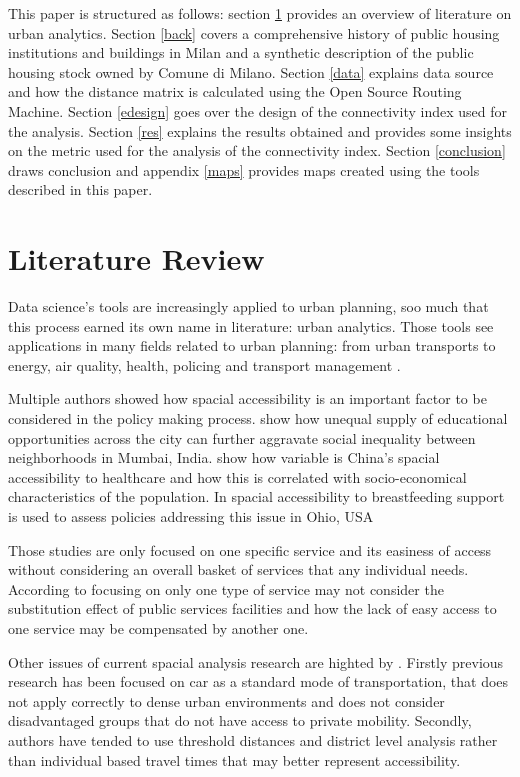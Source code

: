 \documentclass[11pt, titlepage]{article}
\begin{document}
This paper is structured as follows: section \ref{lirev} provides an overview of literature on urban analytics. Section \ref{back} covers a comprehensive history of public housing institutions and buildings in Milan and a synthetic description of the public housing stock owned by Comune di Milano. Section \ref{data} explains data source and how the distance matrix is calculated using the Open Source Routing Machine. Section \ref{edesign} goes over the design of the connectivity index used for the analysis. Section \ref{res} explains the results obtained and provides some insights on the metric used for the analysis of the connectivity index. Section \ref{conclusion} draws conclusion and appendix \ref{maps} provides maps created using the tools described in this paper.

\section{Literature Review}
\label{lirev}

Data science's tools are increasingly applied to urban planning, soo much that this process earned its own name in literature: urban analytics. Those tools see applications in many fields related to urban planning: from urban transports to energy, air quality, health, policing and transport management \parencite{Kandt2021}. 

Multiple authors showed how spacial accessibility is an important factor to be considered in the policy making process. \cite{Sharma2022} show how unequal supply of educational opportunities across the city can further aggravate social inequality between neighborhoods in Mumbai, India. \cite{Yin2018} show how variable is China's spacial accessibility to healthcare and how this is correlated with socio-economical characteristics of the population. In \cite{Grubesic2017} spacial accessibility to breastfeeding support is used to assess policies addressing this issue in Ohio, USA

Those studies are only focused on one specific service and its easiness of access without considering an overall basket of services that any individual needs. According to \cite{wang2005assessing}
focusing on only one type of service may not consider the substitution effect of public services facilities and how the lack of easy access to one service may be compensated by another one.

Other issues of current spacial analysis research are highted by \cite{Li2021}. Firstly previous research has been focused on car as a standard mode of transportation, that does not apply correctly to dense urban environments and does not consider disadvantaged groups that do not have access to private mobility. Secondly, authors have tended to use threshold distances and district level analysis rather than individual based travel times that may better represent accessibility.
\end{document}
